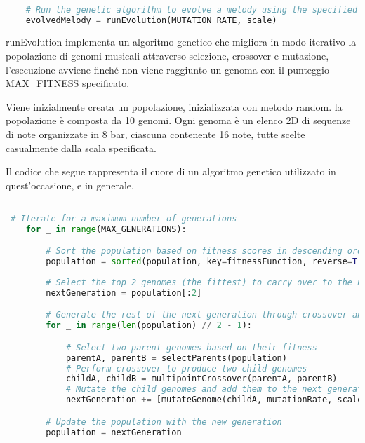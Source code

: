 \documentclass[a4paper,12pt]{report}
\begin{document}
\begin{lstlisting}[language=Python]

    # Run the genetic algorithm to evolve a melody using the specified mutation rate and scale
    evolvedMelody = runEvolution(MUTATION_RATE, scale)

\end{lstlisting}

runEvolution implementa un algoritmo genetico che migliora in modo iterativo la popolazione di genomi musicali attraverso selezione, crossover e mutazione, l'esecuzione avviene finché non viene raggiunto un genoma con il punteggio MAX_FITNESS specificato.

Viene inizialmente creata un popolazione, inizializzata con metodo random. la popolazione è composta da 10 genomi. Ogni genoma è un elenco 2D di sequenze di note organizzate in 8 bar, ciascuna contenente 16 note, tutte scelte casualmente dalla scala specificata.

Il codice che segue rappresenta il cuore di un algoritmo genetico utilizzato in quest'occasione, e in generale.

\begin{lstlisting}[language=Python]

 # Iterate for a maximum number of generations
    for _ in range(MAX_GENERATIONS):

        # Sort the population based on fitness scores in descending order
        population = sorted(population, key=fitnessFunction, reverse=True)
        
        # Select the top 2 genomes (the fittest) to carry over to the next generation
        nextGeneration = population[:2]

        # Generate the rest of the next generation through crossover and mutation
        for _ in range(len(population) // 2 - 1):

            # Select two parent genomes based on their fitness
            parentA, parentB = selectParents(population)
            # Perform crossover to produce two child genomes
            childA, childB = multipointCrossover(parentA, parentB)
            # Mutate the child genomes and add them to the next generation
            nextGeneration += [mutateGenome(childA, mutationRate, scale), mutateGenome(childB, mutationRate, scale)]

        # Update the population with the new generation
        population = nextGeneration
        
\end{lstlisting}
\end{document}
